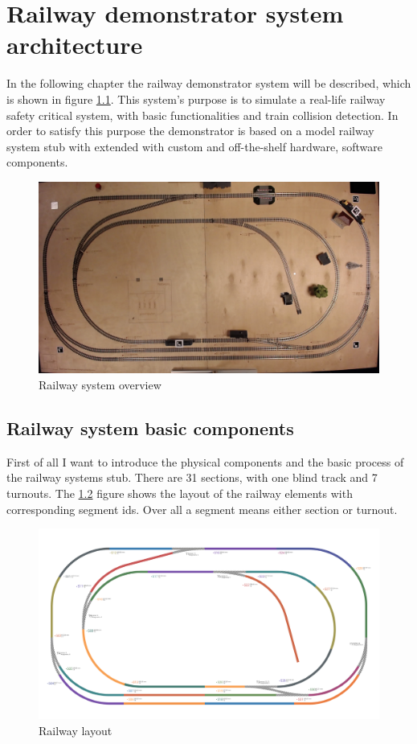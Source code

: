 
\chapter{Railway demonstrator system architecture}
In the following chapter the railway demonstrator system will be described, which is shown in figure \ref{fig:overview}. This system's purpose is to simulate a real-life railway safety critical system, with basic functionalities and train collision detection. In order to satisfy this purpose the demonstrator is based on a model railway system stub with extended with custom and off-the-shelf hardware, software components. 
\begin{figure}[h]
	\centering
	\includegraphics[width=150mm]{figures/modes3/overview.jpg}
	\caption{Railway system overview}
	\label{fig:overview}
\end{figure}
\section{Railway system basic components}
First of all I want to introduce the physical components and the basic process of the railway systems stub. There are 31 sections, with one blind track and 7 turnouts. The \ref{fig:layout} figure shows the layout of the railway elements with corresponding segment ids. Over all a segment means either section or turnout.
\begin{figure}[h]
	\centering
	\includegraphics[width=150mm, keepaspectratio]{figures/modes3/layout2.png}
	\caption{Railway layout}
	\label{fig:layout}
\end{figure}
